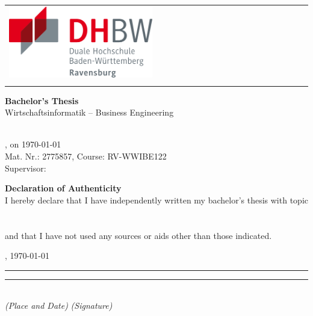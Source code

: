 \begin{titlepage}
	\noindent
    \begin{tabularx}{\textwidth}{@{}l|X@{}}
		\includegraphics[width=0.5\textwidth]{ressources/illustrations/dhwb_logo.png} &
		\begin{minipage}[t]{\linewidth}
			\raggedright
			\Large \textbf{\myTitle} \\
			\vspace{0.5cm}
			\normalsize \mySubtitle
		\end{minipage}
	\end{tabularx}
	
    \vfill
    \centering
    \Large\textbf{Bachelor's Thesis} \\
    \vspace{1cm}
    \normalsize
    Wirtschaftsinformatik – Business Engineering\\
    \myHighSchool\\
    \myLocation
	
    \vfill
	\small
	\myName, on \today \\
	Mat. Nr.: 2775857, Course: RV-WWIBE122 \\
	Supervisor: \mySupervisor
\end{titlepage}

\clearpage
\thispagestyle{empty}
\begin{center}
	\Huge\textbf{Declaration of Authenticity}\\
    \vspace{4cm}
	\normalsize
	I hereby declare that I have independently written my bachelor's thesis with topic\\
    
    \vfill
    \Large \textbf{\myTitle} \\
    \large \mySubtitle \\
	
    \vfill
    \normalsize
	and that I have not used any sources or aids other than those indicated.\\
\end{center}
\vspace{4cm}
\myLocation, \today \\
\rule{6cm}{0.1pt} \hfill \rule{6cm}{0.1pt} \\
\textit{(Place and Date)} \hfill \textit{(Signature)}
\newpage

